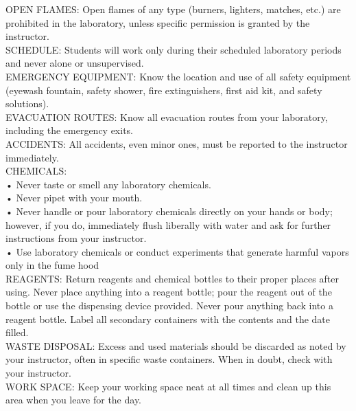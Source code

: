 \documentclass[12pt]{article}
\begin{document}
OPEN FLAMES: Open flames of any type (burners, lighters, matches, etc.) are prohibited in the laboratory, unless specific permission is granted by the instructor.\\
\newline %
SCHEDULE: Students will work only during their scheduled laboratory periods and never alone or unsupervised.\\
\newline %
EMERGENCY EQUIPMENT: Know the location and use of all safety equipment (eyewash fountain, safety shower, fire extinguishers, first aid kit, and safety solutions).\\
\newline %
EVACUATION ROUTES: Know all evacuation routes from your laboratory, including the emergency exits.\\
\newline %
ACCIDENTS: All accidents, even minor ones, must be reported to the instructor immediately. \\
\newline %
CHEMICALS:\\
\newline %
• Never taste or smell any laboratory chemicals.\\
• Never pipet with your mouth.\\
• Never handle or pour laboratory chemicals directly on your hands or body; however, if you do, immediately flush liberally with water and ask for further instructions from your instructor.\\
• Use laboratory chemicals or conduct experiments that generate harmful vapors only in the fume hood\\
\newline %
REAGENTS: Return reagents and chemical bottles to their proper places after using. Never place anything into a reagent bottle; pour the reagent out of the bottle or use the dispensing device provided. Never pour anything back into a reagent bottle. Label all secondary containers with the contents and the date filled. \\
\newline
\newpage
WASTE DISPOSAL: Excess and used materials should be discarded as noted by your instructor, often in specific waste containers. When in doubt, check with your instructor.\\
\newline %
WORK SPACE: Keep your working space neat at all times and clean up this area when you leave for the day.\\
\end{document}
